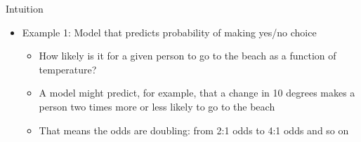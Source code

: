 \documentclass[aspectratio=169]{beamer}
\begin{document}
\begin{frame}[allowframebreaks]{Intuition}
  \vspace{.7cm}
  \begin{itemize}
    \item Example 1: Model that predicts probability of making yes/no
      choice
      \begin{itemize}
        \item How likely is it for a given person to go to the beach as a
          function of temperature?
        \item A model might predict, for example, that a change in 10 degrees
          makes a person two times more or less likely to go to the beach
        \item That means the odds are doubling: from 2:1 odds to 4:1 odds
          and so on
      \end{itemize}
  \end{itemize}
  \vspace{.5cm}


\end{frame}
\end{document}
